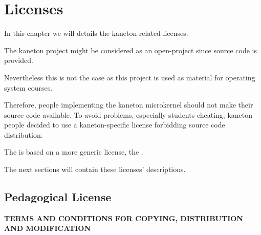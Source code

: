 %
%
%
%
%
%

%
%

\chapter{Licenses}
\label{chapter:licenses}

In this chapter we will details the kaneton-related licenses.

\newpage

%
%

The kaneton project might be considered as an open-project since source
code is provided.

Nevertheless this is not the case as this project is used as material for
operating system courses.

Therefore, people implementing the kaneton microkernel should not
make their source code available. To avoid problems, especially students
cheating, kaneton people decided to use a kaneton-specific license
forbidding source code distribution.

The  is based on a more generic license, the
.

The next sections will contain these licenses' descriptions.

%
%

\section{Pedagogical License}

\textbf{TERMS AND CONDITIONS FOR COPYING, DISTRIBUTION AND MODIFICATION}

